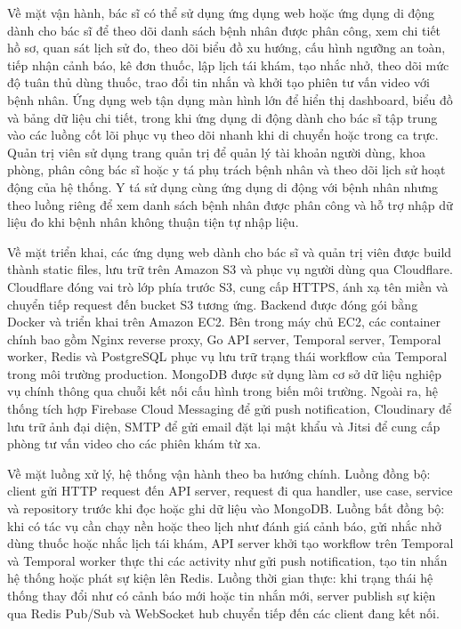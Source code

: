 \par Về mặt vận hành, bác sĩ có thể sử dụng ứng dụng web hoặc ứng dụng di động dành cho bác sĩ để theo dõi danh sách bệnh nhân được phân công, xem chi tiết hồ sơ, quan sát lịch sử đo, theo dõi biểu đồ xu hướng, cấu hình ngưỡng an toàn, tiếp nhận cảnh báo, kê đơn thuốc, lập lịch tái khám, tạo nhắc nhở, theo dõi mức độ tuân thủ dùng thuốc, trao đổi tin nhắn và khởi tạo phiên tư vấn video với bệnh nhân. Ứng dụng web tận dụng màn hình lớn để hiển thị dashboard, biểu đồ và bảng dữ liệu chi tiết, trong khi ứng dụng di động dành cho bác sĩ tập trung vào các luồng cốt lõi phục vụ theo dõi nhanh khi di chuyển hoặc trong ca trực. Quản trị viên sử dụng trang quản trị để quản lý tài khoản người dùng, khoa phòng, phân công bác sĩ hoặc y tá phụ trách bệnh nhân và theo dõi lịch sử hoạt động của hệ thống. Y tá sử dụng cùng ứng dụng di động với bệnh nhân nhưng theo luồng riêng để xem danh sách bệnh nhân được phân công và hỗ trợ nhập dữ liệu đo khi bệnh nhân không thuận tiện tự nhập liệu.

\par Về mặt triển khai, các ứng dụng web dành cho bác sĩ và quản trị viên được build thành static files, lưu trữ trên Amazon S3 và phục vụ người dùng qua Cloudflare. Cloudflare đóng vai trò lớp phía trước S3, cung cấp HTTPS, ánh xạ tên miền và chuyển tiếp request đến bucket S3 tương ứng. Backend được đóng gói bằng Docker và triển khai trên Amazon EC2. Bên trong máy chủ EC2, các container chính bao gồm Nginx reverse proxy, Go API server, Temporal server, Temporal worker, Redis và PostgreSQL phục vụ lưu trữ trạng thái workflow của Temporal trong môi trường production. MongoDB được sử dụng làm cơ sở dữ liệu nghiệp vụ chính thông qua chuỗi kết nối cấu hình trong biến môi trường. Ngoài ra, hệ thống tích hợp Firebase Cloud Messaging để gửi push notification, Cloudinary để lưu trữ ảnh đại diện, SMTP để gửi email đặt lại mật khẩu và Jitsi để cung cấp phòng tư vấn video cho các phiên khám từ xa.

\par Về mặt luồng xử lý, hệ thống vận hành theo ba hướng chính. Luồng đồng bộ: client gửi HTTP request đến API server, request đi qua handler, use case, service và repository trước khi đọc hoặc ghi dữ liệu vào MongoDB. Luồng bất đồng bộ: khi có tác vụ cần chạy nền hoặc theo lịch như đánh giá cảnh báo, gửi nhắc nhở dùng thuốc hoặc nhắc lịch tái khám, API server khởi tạo workflow trên Temporal và Temporal worker thực thi các activity như gửi push notification, tạo tin nhắn hệ thống hoặc phát sự kiện lên Redis. Luồng thời gian thực: khi trạng thái hệ thống thay đổi như có cảnh báo mới hoặc tin nhắn mới, server publish sự kiện qua Redis Pub/Sub và WebSocket hub chuyển tiếp đến các client đang kết nối.

